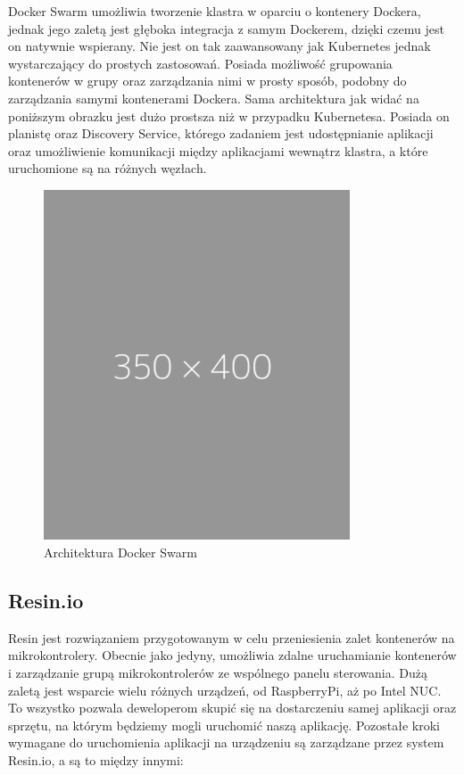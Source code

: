 \documentclass[12pt]{report}
\let\Oldsubsection\subsection
\renewcommand{\subsection}{\FloatBarrier\Oldsubsection}
\begin{document}
{Docker Swarm umożliwia tworzenie klastra w oparciu o kontenery Dockera, jednak jego zaletą jest głęboka integracja z samym Dockerem, dzięki czemu jest on natywnie wspierany. Nie jest on tak zaawansowany jak Kubernetes jednak wystarczający do prostych zastosowań. Posiada możliwość grupowania kontenerów w grupy oraz zarządzania nimi w prosty sposób, podobny do zarządzania samymi kontenerami Dockera. Sama architektura jak widać na poniższym obrazku jest dużo prostsza niż w przypadku Kubernetesa. Posiada on planistę oraz Discovery Service, którego zadaniem jest udostępnianie aplikacji oraz umożliwienie komunikacji między aplikacjami wewnątrz klastra, a które uruchomione są na różnych węzłach.

\begin{figure}[h]
	\centering
	\includegraphics[width=0.81\textwidth]{images/placeholder.png}
	\caption{Architektura Docker Swarm}
\end{figure}

\subsection{Resin.io}

Resin jest rozwiązaniem przygotowanym w celu przeniesienia zalet kontenerów na mikrokontrolery. Obecnie jako jedyny, umożliwia zdalne uruchamianie kontenerów i zarządzanie grupą mikrokontrolerów ze wspólnego panelu sterowania. Dużą zaletą jest wsparcie wielu różnych urządzeń, od RaspberryPi, aż po Intel NUC. To wszystko pozwala deweloperom skupić się na dostarczeniu samej aplikacji oraz sprzętu, na którym będziemy mogli uruchomić naszą aplikację. Pozostałe kroki wymagane do uruchomienia aplikacji na urządzeniu są zarządzane przez system Resin.io, a są to między innymi:

}
\end{document}
